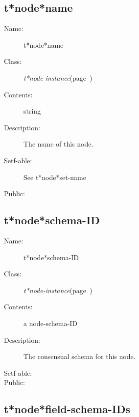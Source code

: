 \subsection{t*node*name}
\label{t*node*name}

\begin{description}
\item [Name:]  t*node*name

\item [Class:] {\sl t*node-instance}\hfill(page~\pageref{t*node-instance})

\item [Contents:] string 

\item [Description:]

The name of this node. 

\item [Setf-able:] See t*node*set-name


\item [Public:]



\end{description}
\horizontalline

\subsection{t*node*schema-ID}
\label{t*node*schema-ID}

\begin{description}
\item [Name:]  t*node*schema-ID

\item [Class:] {\sl t*node-instance}\hfill(page~\pageref{t*node-instance})

\item [Contents:] a node-schema-ID

\item [Description:]

The consensual schema for this node.

\item [Setf-able:]


\item [Public:]



\end{description}
\horizontalline

\subsection{t*node*field-schema-IDs}
\label{t*node*field-schema-IDs}


